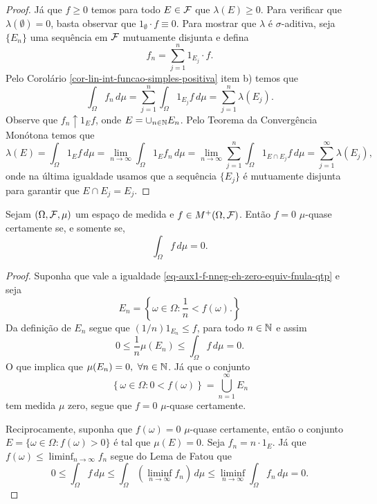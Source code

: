 \begin{proof}
Já que $f\geq 0$ temos para todo $E\in\mathcal{F}$ que
$\lambda(E)\geq 0$. Para verificar que 
$\lambda(\emptyset)=0$, 
basta observar que $1_{\emptyset}\cdot f\equiv 0$.
Para mostrar que $\lambda$ é $\sigma$-aditiva, 
seja $\{E_n\}$ uma sequência em $\mathcal{F}$ 
mutuamente disjunta e defina 
	\[
		f_n = \sum_{j=1}^n 1_{E_j}\cdot f.
	\]
Pelo Corolário \ref{cor-lin-int-funcao-simples-positiva}
item b) temos que 
	\[
		\int_{\Omega} f_n\, d\mu 
		 =
		 \sum_{j=1}^n \int_{\Omega} 1_{E_j} f\, d\mu
		 =
 		 \sum_{j=1}^n \lambda(E_j).
	\]
Observe que $f_n \uparrow 1_{E}f$, onde $E=\cup_{n\in\mathbb{N} }E_n$.
Pelo Teorema da Convergência Monótona temos que 
	\[
		\lambda(E)
		=
		\int_{\Omega} 1_{E}f\, d\mu 
		=
		\lim_{n\to\infty}\int_{\Omega} 1_{E}f_n\, d\mu 
		=
		\lim_{n\to\infty} 
			\sum_{j=1}^n \int_{\Omega} 1_{E\cap E_j} f\, d\mu
		=
 		\sum_{j=1}^{\infty} \lambda(E_j),
	\]
onde na última igualdade usamos que a sequência 
$\{E_j\}$ é mutuamente disjunta para garantir que $E\cap E_j=E_j$.
\end{proof}






\begin{corolario}
\label{cor-int-f-nneg-eh-zero-equiv-fnula-qtp}
Sejam $(\Omega,\mathcal{F},\mu)$ um espaço de medida e 
$f\in M^{+}(\Omega,\mathcal{F})$. Então $f=0$ $\mu$-quase 
certamente se, e somente se, 
	\begin{equation}
	\label{eq-aux1-f-nneg-eh-zero-equiv-fnula-qtp}
	\int_{\Omega}f\, d\mu = 0.
	\end{equation}
\end{corolario}


\begin{proof}
Suponha que  vale a igualdade 
\eqref{eq-aux1-f-nneg-eh-zero-equiv-fnula-qtp}
e seja 
	\[
	E_n 
	=
	\left\{
		\omega\in\Omega: \frac{1}{n}< f(\omega).
	\right\}
	\]
Da definição de $E_n$ segue que $(1/n)1_{E_{n}}\leq f$, 
para todo $n\in\mathbb{N}$ e assim 
	\[
	0\leq \frac{1}{n}\mu(E_n)\leq \int_{\Omega} f\, d\mu =0.
	\]
O que implica que $\mu(E_n)=0,\ \forall n\in\mathbb{N}$.
Já que o conjunto 
	\[
	\left\{
		\omega\in\Omega: 0< f(\omega)
	\right\}
	=
	\bigcup_{n=1}^{\infty} E_n
	\]
tem medida $\mu$ zero, 
segue que $f=0$ $\mu$-quase certamente.


Reciprocamente, suponha que 
$f(\omega)=0$ $\mu$-quase certamente, 
então o conjunto $E=\{\omega\in\Omega: f(\omega)>0\}$
é tal que  $\mu(E)=0$. 
Seja $f_n = n\cdot 1_{E}$. 
Já que $f(\omega)\leq \liminf_{n\to\infty} f_n$ 
segue do Lema de Fatou que 
	\[
	0
	\leq
	\int_{\Omega}f\, d\mu
	\leq 
	\int_{\Omega} \left( \liminf_{n\to\infty} f_n\right)\, d\mu 
	\leq 
	\liminf_{n\to\infty}	\int_{\Omega}f_n\, d\mu 
	=
	0.
	\]
\end{proof}








